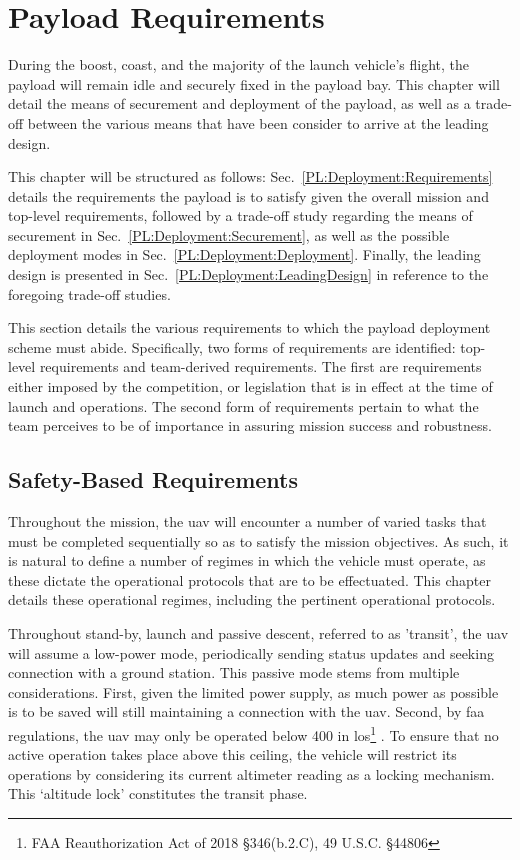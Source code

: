 \chapter{Payload Requirements}

During the boost, coast, and the majority of the launch vehicle's flight, the payload will remain idle and securely fixed in the payload bay. This chapter will detail the means of securement and deployment of the payload, as well as a trade-off between the various means that have been consider to arrive at the leading design.

This chapter will be structured as follows: Sec.~\ref{PL:Deployment:Requirements} details the requirements the payload is to satisfy given the overall mission and top-level requirements, followed by a trade-off study regarding the means of securement in Sec.~\ref{PL:Deployment:Securement}, as well as the possible deployment modes in Sec.~\ref{PL:Deployment:Deployment}. Finally, the leading design is presented in Sec.~\ref{PL:Deployment:LeadingDesign} in reference to the foregoing trade-off studies.

This section details the various requirements to which the payload deployment scheme must abide. Specifically, two forms of requirements are identified: top-level requirements and team-derived requirements. The first are requirements either imposed by the competition, or legislation that is in effect at the time of launch and operations. The second form of requirements pertain to what the team perceives to be of importance in assuring mission success and robustness.
\section{Safety-Based Requirements}
Throughout the mission, the \gls{uav} will encounter a number of varied tasks that must be completed sequentially so as to satisfy the mission objectives. As such, it is natural to define a number of regimes in which the vehicle must operate, as these dictate the operational protocols that are to be effectuated. This chapter details these operational regimes, including the pertinent operational protocols.

Throughout stand-by, launch and passive descent, referred to as 'transit', the \gls{uav} will assume a low-power mode, periodically sending status updates and seeking connection with a ground station. This passive mode stems from multiple considerations. First, given the limited power supply, as much power as possible is to be saved will still maintaining a connection with the \gls{uav}. Second, by \gls{faa} regulations, the \gls{uav} may only be operated below \SI{400}{\feet} in \gls{los}\footnote{FAA Reauthorization Act of 2018 \S 346(b.2.C), 49 U.S.C. \S 44806} \citep{FederalAviationAdministration2018}. To ensure that no active operation takes place above this ceiling, the vehicle will restrict its operations by considering its current altimeter reading as a locking mechanism. This `altitude lock' constitutes the transit phase.

